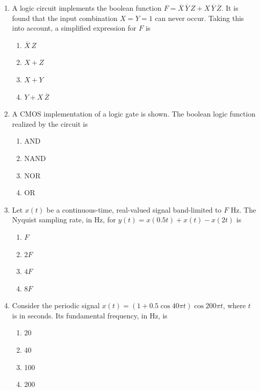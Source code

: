\documentclass[journal]{IEEEtran}
\begin{document}
\begin{enumerate}
\item A logic circuit implements the boolean function 
$F = \overline{X} \, \overline{Y} \, Z + X \, \overline{Y} \, \overline{Z}$.  
It is found that the input combination $X=Y=1$ can never occur. Taking this into account, a simplified expression for $F$ is
\begin{multicols}{4}
\begin{enumerate}
\item $\overline{X} \, Z$  
\item $X + Z$  
\item $X + Y$  
\item $Y + X \, \overline{Z}$  
\end{enumerate}
\end{multicols}

\item A CMOS implementation of a logic gate is shown.  
The boolean logic function realized by the circuit is
\begin{multicols}{4}
\begin{enumerate}
\item AND  
\item NAND  
\item NOR  
\item OR  
\end{enumerate}
\end{multicols}

\item Let $x(t)$ be a continuous-time, real-valued signal band-limited to $F$ Hz.  
The Nyquist sampling rate, in Hz, for $y(t) = x(0.5t) + x(t) - x(2t)$ is
\begin{multicols}{4}
\begin{enumerate}
\item $F$  
\item $2F$  
\item $4F$  
\item $8F$  
\end{enumerate}
\end{multicols}

\item Consider the periodic signal $x(t) = (1 + 0.5\cos 40\pi t)\cos 200\pi t$, where $t$ is in seconds.  
Its fundamental frequency, in Hz, is
\begin{multicols}{4}
\begin{enumerate}
\item 20  
\item 40  
\item 100  
\item 200  
\end{enumerate}
\end{multicols}


\end{enumerate}
\end{document}
